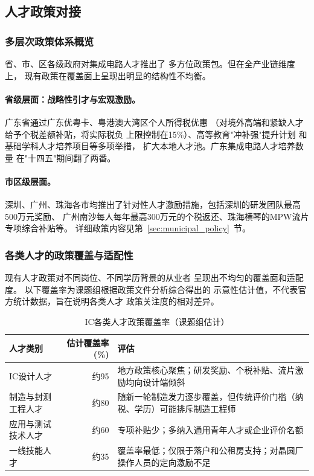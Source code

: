 \documentclass[12pt,a4paper]{article}
\newcommand{\tableHeaderRow}{\rowcolor{tealPrimary}\color{white}}
\newcommand{\tableOddRow}{\rowcolor{mintBG}}
\newcommand{\tableEvenRow}{\rowcolor{white}}
\begin{document}
\subsection{人才政策对接}
\label{sec:talent_policy}

\subsubsection{多层次政策体系概览}

省、市、区各级政府对集成电路人才推出了
多方位政策包。但在全产业链维度上，
现有政策在覆盖面上呈现出明显的结构性不均衡。

\paragraph{省级层面：战略性引才与宏观激励。}
广东省通过广东优粤卡、粤港澳大湾区个人所得税优惠
（对境外高端和紧缺人才给予个税差额补贴，将实际税负
上限控制在15\%）、高等教育"冲补强"提升计划
和基础学科人才培养项目等多项举措，
扩大本地人才池。广东集成电路人才培养数量
在"十四五"期间翻了两番。

\paragraph{市区级层面。}
深圳、广州、珠海各市均推出了针对性人才激励措施，包括深圳的研发团队最高500万元奖励、
广州南沙每人每年最高300万元的个税返还、珠海横琴的MPW流片专项综合补贴等。
详细政策内容见第~\ref{sec:municipal_policy}~节。

\subsubsection{各类人才的政策覆盖与适配性}

现有人才政策对不同岗位、不同学历背景的从业者
呈现出不均匀的覆盖面和适配度。
{\footnotesize 以下覆盖率为课题组根据政策文件分析综合得出的
示意性估计值，不代表官方统计数据，旨在说明各类人才
政策关注度的相对差异。}

\begin{table}[H]
\centering
\caption{IC各类人才政策覆盖率（课题组估计）}
\label{tab:policy_coverage}
\begin{tabular}{p{3.5cm}rp{7.5cm}}
\toprule
\tableHeaderRow
\textbf{人才类别} & \textbf{估计覆盖率 (\%)} & \textbf{评估} \\
\midrule
\tableOddRow  IC设计人才    & 约95 & 地方政策核心聚焦；研发奖励、个税补贴、流片激励均向设计端倾斜 \\
\tableEvenRow 制造与封测工程人才 & 约80 & 随新一轮制造发力逐步覆盖，但传统评价门槛（纳税、学历）可能排斥制造工程师 \\
\tableOddRow  应用与测试技术人才   & 约60 & 专项补贴少；多纳入通用青年人才或企业评价名额 \\
\tableEvenRow 一线技能人才          & 约35 & 覆盖率最低；仅限于落户和公租房支持；对晶圆厂操作人员的定向激励不足 \\
\bottomrule
\end{tabular}
\end{table}
\end{document}
